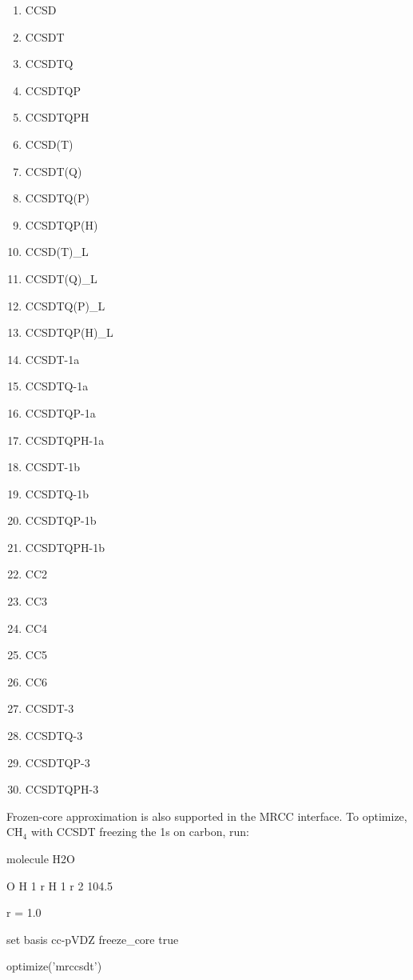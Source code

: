 \begin{enumerate}
\item CCSD         
\item CCSDT        
\item CCSDTQ       
\item CCSDTQP      
\item CCSDTQPH     
\item CCSD(T)      
\item CCSDT(Q)     
\item CCSDTQ(P)    
\item CCSDTQP(H)   
\item CCSD(T)\_L    
\item CCSDT(Q)\_L   
\item CCSDTQ(P)\_L  
\item CCSDTQP(H)\_L 
\item CCSDT-1a     
\item CCSDTQ-1a    
\item CCSDTQP-1a   
\item CCSDTQPH-1a  
\item CCSDT-1b     
\item CCSDTQ-1b    
\item CCSDTQP-1b   
\item CCSDTQPH-1b  
\item CC2          
\item CC3          
\item CC4          
\item CC5          
\item CC6          
\item CCSDT-3      
\item CCSDTQ-3     
\item CCSDTQP-3    
\item CCSDTQPH-3   
\end{enumerate}

Frozen-core approximation is also supported in the MRCC interface. To optimize, CH$_4$ with CCSDT freezing the 1s on carbon, run:

\begin{Snippet}
molecule H2O {
    O
    H 1 r
    H 1 r 2 104.5

    r = 1.0
}

set {
    basis cc-pVDZ
    freeze_core true
}

optimize('mrccsdt')
\end{Snippet}
